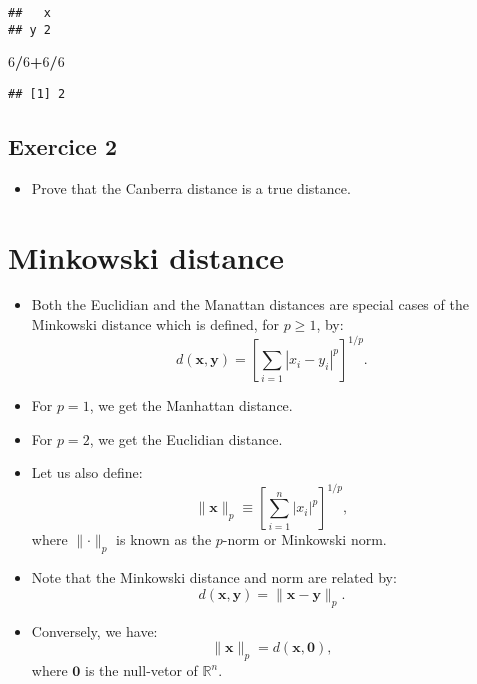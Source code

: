 \documentclass[
]{article}
\newenvironment{Shaded}{\begin{snugshade}}{\end{snugshade}}
\newcommand{\DecValTok}[1]{\textcolor[rgb]{0.00,0.00,0.81}{#1}}
\newcommand{\OperatorTok}[1]{\textcolor[rgb]{0.81,0.36,0.00}{\textbf{#1}}}
\providecommand{\tightlist}{%
  \setlength{\itemsep}{0pt}\setlength{\parskip}{0pt}}
\begin{document}
\begin{verbatim}
##   x
## y 2
\end{verbatim}

\begin{Shaded}
\begin{Highlighting}[]
\DecValTok{6}\OperatorTok{/}\DecValTok{6}\OperatorTok{+}\DecValTok{6}\OperatorTok{/}\DecValTok{6}
\end{Highlighting}
\end{Shaded}

\begin{verbatim}
## [1] 2
\end{verbatim}

\hypertarget{exercice-2}{%
\subsection{Exercice 2}\label{exercice-2}}

\begin{itemize}
\tightlist
\item
  Prove that the Canberra distance is a true distance.
\end{itemize}

\hypertarget{minkowski-distance}{%
\section{Minkowski distance}\label{minkowski-distance}}

\begin{itemize}
\tightlist
\item
  Both the Euclidian and the Manattan distances are special cases of the
  Minkowski distance which is defined, for \(p\geq 1\), by: \[
  d(\mathbf{x},\mathbf{y})=
  \left[\sum_{i=1} |x_i-y_i|^{p}\right]^{1/p}.
  \]
\item
  For \(p=1\), we get the Manhattan distance.
\item
  For \(p=2\), we get the Euclidian distance.
\item
  Let us also define:
  \[\|\mathbf{x}\|_p\equiv\left[\sum_{i=1}^n |x_i|^{p}\right]^{1/p},\]
  where \(\|\mathbf{\cdot}\|_p\) is known as the \(p\)-norm or Minkowski
  norm.
\item
  Note that the Minkowski distance and norm are related by: \[
  d(\mathbf{x},\mathbf{y})=\|\mathbf{x}-\mathbf{y}\|_p.
  \]
\item
  Conversely, we have: \[
  \|\mathbf{x}\|_p=d(\mathbf{x},\mathbf{0}),
  \] where \(\mathbf{0}\) is the null-vetor of \(\mathbb{R}^n\).
\end{itemize}
\end{document}

